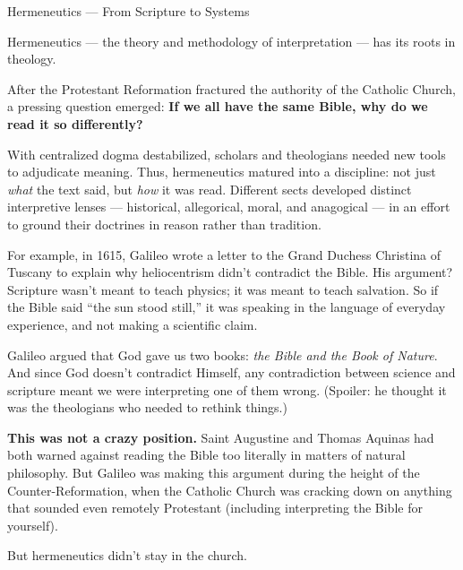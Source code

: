 \begin{PhilosophicalSidebar}{Hermeneutics --- From Scripture to Systems}

    Hermeneutics — the theory and methodology of interpretation — has its roots in theology.
    
    \medskip
    
    After the Protestant Reformation fractured the authority of the Catholic Church, a pressing question emerged:  
    \textbf{If we all have the same Bible, why do we read it so differently?}
    
    \medskip
    
    With centralized dogma destabilized, scholars and theologians needed new tools to adjudicate meaning. Thus, 
    hermeneutics matured into a discipline: not just \textit{what} the text said, but \textit{how} it was read.  
    Different sects developed distinct interpretive lenses — historical, allegorical, moral, and anagogical — 
    in an effort to ground their doctrines in reason rather than tradition.


    \medskip

    For example, in 1615, Galileo wrote a letter to the Grand Duchess Christina of Tuscany to explain why 
    heliocentrism didn’t contradict the Bible. His argument? Scripture wasn’t meant to teach physics; it was 
    meant to teach salvation. So if the Bible said “the sun stood still,” it was speaking in the language of 
    everyday experience, and not making a scientific claim. 

    \medskip
  
    Galileo argued that God gave us two books: \emph{the Bible and the Book of Nature}. And since God doesn’t 
    contradict Himself, any contradiction between science and scripture meant we were interpreting one of 
    them wrong. (Spoiler: he thought it was the theologians who needed to rethink things.)
  
    \medskip
  
    \textbf{This was not a crazy position.} Saint Augustine and Thomas Aquinas had both warned against 
    reading the Bible too literally in matters of natural philosophy. But Galileo was making this argument 
    during the height of the Counter-Reformation, when the Catholic Church was cracking down on anything 
    that sounded even remotely Protestant (including interpreting the Bible for yourself). 
    
    \medskip
    
    But hermeneutics didn’t stay in the church.
    

\end{PhilosophicalSidebar}
